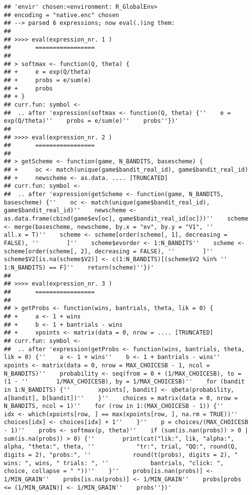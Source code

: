 \documentclass[11pt,,]{article}
\begin{document}
\begin{verbatim}
## 'envir' chosen:<environment: R_GlobalEnv>
## encoding = "native.enc" chosen
## --> parsed 6 expressions; now eval(.)ing them:
## 
## >>>> eval(expression_nr. 1 )
##       =================
## 
## > softmax <- function(Q, theta) {
## +     e = exp(Q/theta)
## +     probs = e/sum(e)
## +     probs
## + }
## curr.fun: symbol <-
##  .. after 'expression(softmax <- function(Q, theta) {''    e = exp(Q/theta)''    probs = e/sum(e)''    probs''})'
## 
## >>>> eval(expression_nr. 2 )
##       =================
## 
## > getScheme <- function(game, N_BANDITS, basescheme) {
## +     oc <- match(unique(game$bandit_real_id), game$bandit_real_id)
## +     newscheme <- as.data. .... [TRUNCATED] 
## curr.fun: symbol <-
##  .. after 'expression(getScheme <- function(game, N_BANDITS, basescheme) {''    oc <- match(unique(game$bandit_real_id), game$bandit_real_id)''    newscheme <- as.data.frame(cbind(game$ev[oc], game$bandit_real_id[oc]))''    scheme <- merge(basescheme, newscheme, by.x = "ev", by.y = "V1", ''        all.x = T)''    scheme <- scheme[order(scheme[, 1], decreasing = FALSE), ''        ]''    scheme$evorder <- 1:N_BANDITS''    scheme <- scheme[order(scheme[, 2], decreasing = FALSE), ''        ]''    scheme$V2[is.na(scheme$V2)] <- c(1:N_BANDITS)[(scheme$V2 %in% ''        1:N_BANDITS) == F]''    return(scheme)''})'
## 
## >>>> eval(expression_nr. 3 )
##       =================
## 
## > getProbs <- function(wins, bantrials, theta, lik = 0) {
## +     a <- 1 + wins
## +     b <- 1 + bantrials - wins
## +     xpoints <- matrix(data = 0, nrow = .... [TRUNCATED] 
## curr.fun: symbol <-
##  .. after 'expression(getProbs <- function(wins, bantrials, theta, lik = 0) {''    a <- 1 + wins''    b <- 1 + bantrials - wins''    xpoints <- matrix(data = 0, nrow = MAX_CHOICESB - 1, ncol = N_BANDITS)''    probability <- seq(from = 0 + (1/MAX_CHOICESB), to = (1 - ''        1/MAX_CHOICESB), by = 1/MAX_CHOICESB)''    for (bandit in 1:N_BANDITS) {''        xpoints[, bandit] <- qbeta(probability, a[bandit], b[bandit])''    }''    choices = matrix(data = 0, nrow = N_BANDITS, ncol = 1)''    for (row in 1:(MAX_CHOICESB - 1)) {''        idx <- which(xpoints[row, ] == max(xpoints[row, ], na.rm = TRUE))''        choices[idx] <- choices[idx] + 1''    }''    p = choices/(MAX_CHOICESB - 1)''    probs <- softmax(p, theta)''    if (sum(is.nan(probs)) > 0 | sum(is.na(probs)) > 0) {''        print(cat("lik:", lik, "alpha:", alpha, "theta:", theta, ''            "tr:", trial, "QQ:", round(Q, digits = 2), "probs:", ''            round(t(probs), digits = 2), " wins: ", wins, " trials: ", ''            bantrials, "click: ", choice, collapse = " "))''    }''    probs[is.nan(probs)] <- 1/MIN_GRAIN''    probs[is.na(probs)] <- 1/MIN_GRAIN''    probs[probs <= (1/MIN_GRAIN)] <- 1/MIN_GRAIN''    probs''})'

\end{verbatim}
\end{document}
